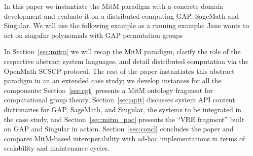 In this paper we instantiate the MitM paradigm with a concrete domain development and evaluate it on a distributed computing GAP, SageMath and Singular.
We will use the following example as a running example: Jane wants to act on singular polynomials with GAP permutation groups

In Section~\ref{sec:mitm} we will recap the MitM paradigm, clarify the role of the respective abstract system languages, and  detail distributed computation via the OpenMath SCSCP protocol.
The rest of the paper instantiates this abstract paradigm in an an extended case study; we develop instances for all the components: Section~\ref{sec:cgt} presents a MitM ontology fragment for computational group theory, Section~\ref{sec:apit} discusses system API content dictionaries for GAP, SageMath, and Singular, the systems to be integrated in the case study, and Section~\ref{sec:mitm_poc} presents the ``VRE fragment'' built on GAP and Singular in action. 
Section~\ref{sec:concl} concludes the paper and compares MitM-based interoperability with ad-hoc implementations in terms of scalability and maintenance cycles. 


